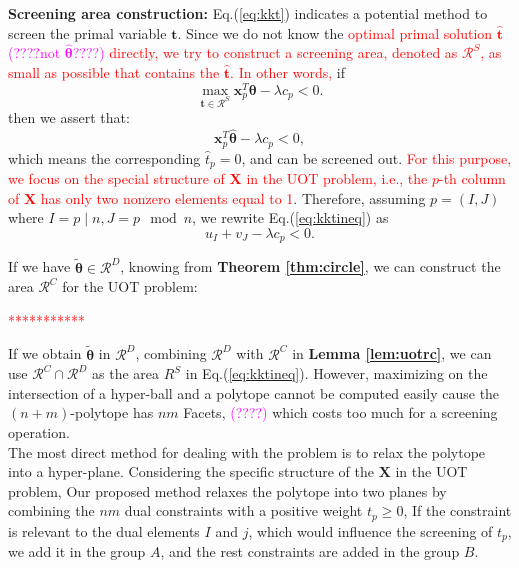 \documentclass[twoside]{article}
\theoremstyle{plain}
\newcommand{\mat}[1]{\mathbf{#1}}
\renewcommand{\vec}[1]{\bm{#1}}
\newcommand{\changeHK}[1]{\textcolor{red}{#1}}
\newcommand{\note}[1]{\textcolor{magenta}{#1}}
\begin{document}
{\bf Screening area construction:}
Eq.(\ref{eq:kkt}) indicates a potential method to screen the primal variable $\vec{t}$. Since we do not know the \changeHK{optimal primal solution $\hat{\vec{t}}$ \note{(????not $\hat{\vec{\theta}}$????)} directly, we try to construct a screening area, denoted as $\mathcal{R}^{S}$, as small as possible that contains the $\hat{\vec{t}}$. In other words,} if
\begin{equation*}
\max_{\vec{t} \in \mathcal{R}^S} \vec{x}_p^T\vec{\theta} -\lambda c_p < 0.
\end{equation*}
then we assert that:
\begin{equation}
\vec{x}_p^T\hat{\vec{\theta}} -\lambda c_p < 0,
\label{eq:kktineq}
\end{equation}
which means the corresponding $\hat{{t}}_p = 0$, and can be screened out. \changeHK{For this purpose, we focus on the special structure of $\vec{X}$ in the UOT problem, i.e., the $p$-th column of $\mat{X}$ has only two nonzero elements equal to 1}. Therefore, assuming $p=(I,J)$ where $I = p \mid n, J = p \mod n$, we rewrite Eq.(\ref{eq:kktineq}) as
%
\begin{equation}
u_{I} + v_{J}-\lambda c_p < 0.
\end{equation}

If we have $\tilde{\vec{\theta}} \in \mathcal{R}^{D}$, knowing from {\bf Theorem \ref{thm:circle}}, we can construct the area $\mathcal{R}^{C}$ for the UOT problem:

\changeHK{***********}


If we obtain $\tilde{\vec{\theta}}$ in $\mathcal{R}^{D}$, combining $\mathcal{R}^{D}$ with $\mathcal{R}^{C}$ in {\bf Lemma \ref{lem:uotrc}}, we can use $\mathcal{R}^{C}\cap\mathcal{R}^{D}$ as the area $R^{S}$ in Eq.(\ref{eq:kktineq}). However, maximizing on the intersection of a hyper-ball and a polytope cannot be computed easily cause the $(n+m)$-polytope has $nm$ Facets, \note{(????)} which costs too much for a screening operation.\\
The most direct method for dealing with the problem is to relax the polytope into a hyper-plane. Considering the specific structure of the $\mat X$ in the UOT problem, Our proposed method relaxes the polytope into two planes by combining the $nm$ dual constraints with a positive weight $t_p \geq 0$, If the constraint is relevant to the dual elements $I$ and $j$, which would influence the screening of $t_p$, we add it in the group $A$, and the rest constraints are added in the group $B$.
\end{document}
